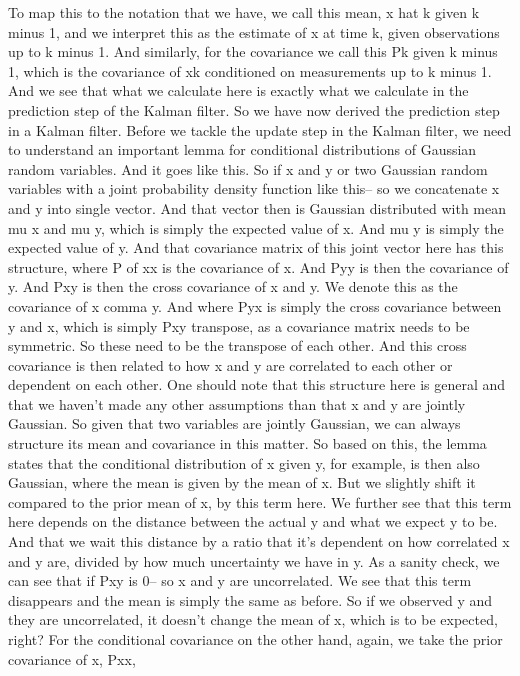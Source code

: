 To map this to the notation that we have,
we call this mean, x hat k given k minus 1,
and we interpret this as the estimate of x at time k,
given observations up to k minus 1.
And similarly, for the covariance
we call this Pk given k minus 1, which
is the covariance of xk conditioned on measurements
up to k minus 1.
And we see that what we calculate here
is exactly what we calculate in the prediction
step of the Kalman filter.
So we have now derived the prediction step
in a Kalman filter.
Before we tackle the update step in the Kalman filter,
we need to understand an important lemma
for conditional distributions of Gaussian random variables.
And it goes like this.
So if x and y or two Gaussian random variables
with a joint probability density function like this--
so we concatenate x and y into single vector.
And that vector then is Gaussian distributed
with mean mu x and mu y, which is simply
the expected value of x.
And mu y is simply the expected value of y.
And that covariance matrix of this joint vector
here has this structure, where P of xx is the covariance of x.
And Pyy is then the covariance of y.
And Pxy is then the cross covariance of x and y.
We denote this as the covariance of x comma y.
And where Pyx is simply the cross covariance between y
and x, which is simply Pxy transpose,
as a covariance matrix needs to be symmetric.
So these need to be the transpose of each other.
And this cross covariance is then
related to how x and y are correlated
to each other or dependent on each other.
One should note that this structure here is general
and that we haven't made any other assumptions than that x
and y are jointly Gaussian.
So given that two variables are jointly Gaussian,
we can always structure its mean and covariance in this matter.
So based on this, the lemma states
that the conditional distribution of x given
y, for example, is then also Gaussian, where the mean is
given by the mean of x.
But we slightly shift it compared to the prior mean
of x, by this term here.
We further see that this term here
depends on the distance between the actual y
and what we expect y to be.
And that we wait this distance by a ratio
that it's dependent on how correlated x and y are,
divided by how much uncertainty we have in y.
As a sanity check, we can see that if Pxy is 0--
so x and y are uncorrelated.
We see that this term disappears and the mean
is simply the same as before.
So if we observed y and they are uncorrelated,
it doesn't change the mean of x, which is to be expected, right?
For the conditional covariance on the other hand,
again, we take the prior covariance of x, Pxx,
